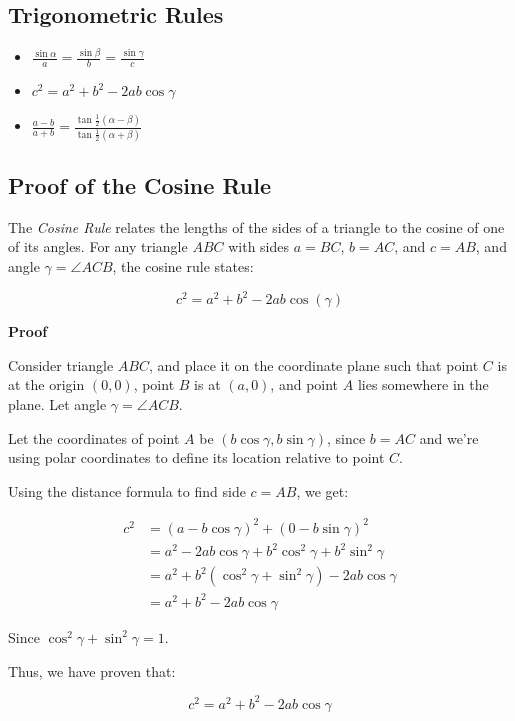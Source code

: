 \subsection{Trigonometric Rules}

\begin{itemize}[label =\(-\)]

    \item \(\frac{\sin \alpha}{a} = \frac{\sin \beta}{b} = \frac{\sin \gamma}{c}\)

    \item \(c^2 = a^2 + b^2 - 2ab \cos \gamma\)

    \item \(\frac{a - b}{a + b} = \frac{\tan \frac{1}{2}(\alpha - \beta)}{\tan \frac{1}{2} (\alpha + \beta)}\)

\end{itemize}


\subsection{Proof of the Cosine Rule}

The \emph{Cosine Rule} relates the lengths of the sides of a triangle to the cosine of one of its angles. 
For any triangle \( ABC \) with sides \( a = BC \), \( b = AC \), and \( c = AB \), and angle 
\( \gamma = \angle ACB \), the cosine rule states:

\[
    c^2 = a^2 + b^2 - 2ab\cos(\gamma)
\]

\textbf{Proof}

Consider triangle \( ABC \), and place it on the coordinate plane such that point \( C \) is at the origin
\( (0,0) \), point \( B \) is at \( (a,0) \), and point \( A \) lies somewhere in the plane. 
Let angle \( \gamma = \angle ACB \).
\vspace{\baselineskip}

Let the coordinates of point \( A \) be \( (b\cos\gamma, b\sin\gamma) \), since \( b = AC \) and we’re 
using polar coordinates to define its location relative to point \( C \).
\vspace{\baselineskip}

Using the distance formula to find side \( c = AB \), we get:

\begin{align*}
    c^2 &= {(a - b\cos\gamma)}^2 + {(0 - b\sin\gamma)}^2 \\
    &= a^2 - 2ab\cos\gamma + b^2\cos^2\gamma + b^2\sin^2\gamma \\
    &= a^2 + b^2(\cos^2\gamma + \sin^2\gamma) - 2ab\cos\gamma \\
    &= a^2 + b^2 - 2ab\cos\gamma
\end{align*}

Since \( \cos^2\gamma + \sin^2\gamma = 1 \).
\vspace{\baselineskip}

Thus, we have proven that:

\[
    c^2 = a^2 + b^2 - 2ab\cos\gamma
\]

\QED